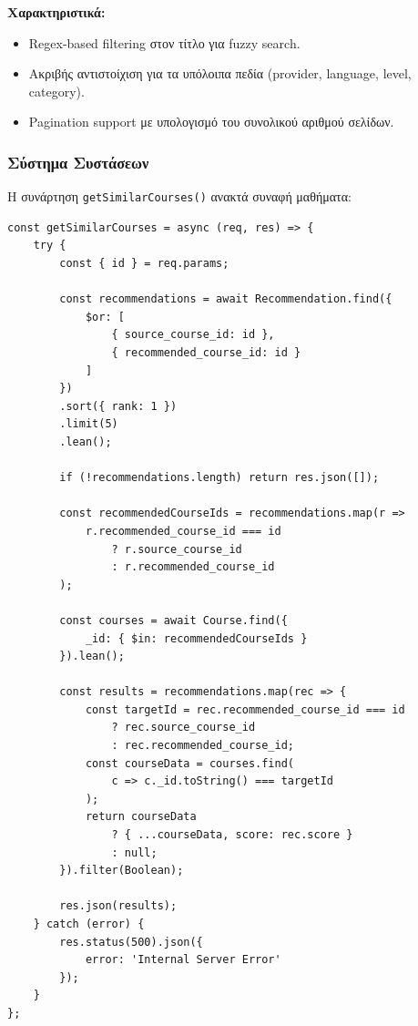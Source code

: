 \documentclass[a4paper,12pt]{article}
\begin{document}
\textbf{Χαρακτηριστικά:}
\begin{itemize}
    \item Regex-based filtering στον τίτλο για fuzzy search.
    \item Ακριβής αντιστοίχιση για τα υπόλοιπα πεδία (provider, language, level, category).
    \item Pagination support με υπολογισμό του συνολικού αριθμού σελίδων.
\end{itemize}

\subsubsection{Σύστημα Συστάσεων}

Η συνάρτηση \texttt{getSimilarCourses()} ανακτά συναφή μαθήματα:

\begin{verbatim}
const getSimilarCourses = async (req, res) => {
    try {
        const { id } = req.params;

        const recommendations = await Recommendation.find({
            $or: [
                { source_course_id: id },
                { recommended_course_id: id }
            ]
        })
        .sort({ rank: 1 })
        .limit(5)
        .lean();
        
        if (!recommendations.length) return res.json([]);

        const recommendedCourseIds = recommendations.map(r => 
            r.recommended_course_id === id 
                ? r.source_course_id 
                : r.recommended_course_id
        );
        
        const courses = await Course.find({ 
            _id: { $in: recommendedCourseIds } 
        }).lean();

        const results = recommendations.map(rec => {
            const targetId = rec.recommended_course_id === id 
                ? rec.source_course_id 
                : rec.recommended_course_id;
            const courseData = courses.find(
                c => c._id.toString() === targetId
            );
            return courseData 
                ? { ...courseData, score: rec.score } 
                : null;
        }).filter(Boolean);

        res.json(results);
    } catch (error) {
        res.status(500).json({ 
            error: 'Internal Server Error' 
        });
    }
};
\end{verbatim}
\end{document}
